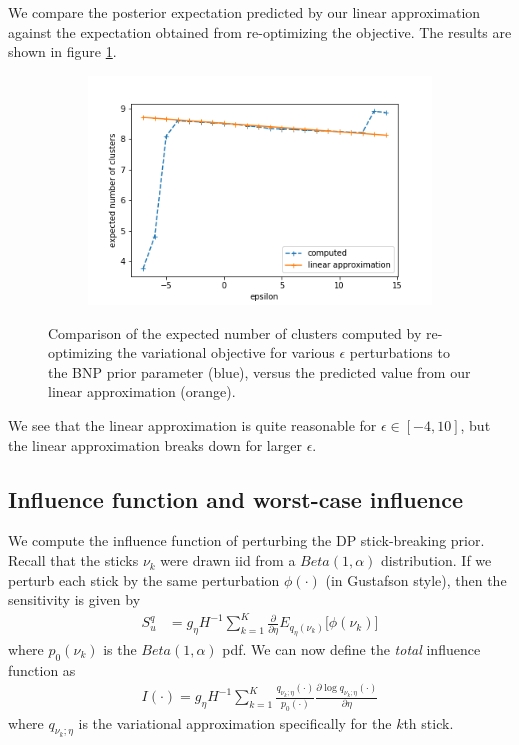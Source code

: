 \documentclass[a4paper]{article}
\begin{document}
We compare the posterior expectation predicted by our linear approximation against the
expectation obtained from re-optimizing the objective. The results are shown in figure
\ref{fig:parametric_sens_e_num_clusters}.

\begin{figure}[h!]
	\centering
	\begin{subfigure}[t]{0.4\textwidth}
		\includegraphics[width = \textwidth]{./parametric_sens_results/pred_num_clusters.png}
	\end{subfigure}
	\caption{Comparison of the expected number of clusters computed by re-optimizing
  the variational objective for various $\epsilon$ perturbations to the BNP prior parameter
  (blue),
  versus the predicted value from our linear approximation (orange). }
	\label{fig:parametric_sens_e_num_clusters}
\end{figure}

We see that the linear approximation is quite reasonable for $\epsilon \in [-4, 10]$,
but the linear approximation breaks down for larger $\epsilon$.

\subsection{Influence function and worst-case influence}
We compute the influence function of perturbing the DP stick-breaking prior.
Recall that the sticks $\nu_k$ were drawn iid
from a $Beta(1, \alpha)$ distribution.
If we perturb each stick by the same perturbation $\phi(\cdot)$ (in Gustafson style), then the sensitivity is given by
\begin{align}
S_u^q &=
g_\eta H^{-1} \sum_{k = 1}^K \frac{\partial}{\partial \eta} E_{q_\eta(\nu_k)}\Big[\phi(\nu_k) \Big]
\end{align}
where $p_0(\nu_k)$ is the $Beta(1, \alpha)$ pdf. We can now define the {\itshape total} influence function as
\begin{align}
I(\cdot) = g_\eta H^{-1} \sum_{k = 1}^K \frac{q_{\nu_k; \eta}(\cdot)}{p_0(\cdot)}\frac{\partial\log q_{\nu_k; \eta}(\cdot)}{\partial \eta}
\label{eq:total_influence}
\end{align}
where $q_{\nu_k; \eta}$ is the variational approximation specifically for the $k$th stick.
\end{document}

